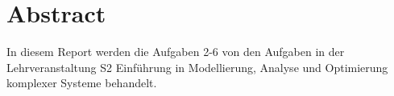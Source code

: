 \chapter{Abstract}

In diesem Report werden die Aufgaben 2-6 von den Aufgaben in der Lehrveranstaltung S2 Einführung in Modellierung, Analyse und Optimierung komplexer Systeme behandelt.